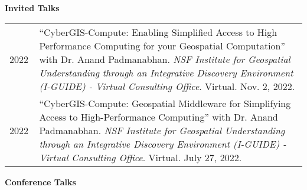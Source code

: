 \documentclass{acmcv}
\begin{document}
    \textbf{Invited Talks}
    \vspace*{-0.35cm}

    \begin{longtable}{p{0.1\linewidth} p{0.9\linewidth}}

        2022 & ``CyberGIS-Compute: Enabling Simplified Access to High Performance Computing for your Geospatial Computation'' with Dr. Anand Padmanabhan. \textit{NSF Institute for Geospatial Understanding through an Integrative Discovery Environment (I-GUIDE) - Virtual Consulting Office}. Virtual. Nov. 2, 2022.\\

        2022 & ``CyberGIS-Compute: Geospatial Middleware for Simplifying Access to High-Performance Computing'' with Dr. Anand Padmanabhan. \textit{NSF Institute for Geospatial Understanding through an Integrative Discovery Environment (I-GUIDE) - Virtual Consulting Office}. Virtual. July 27, 2022. \\


    \end{longtable}
    \vspace*{-0.1cm}

	\textbf{Conference Talks}
    \vspace*{-0.35cm}
\end{document}
